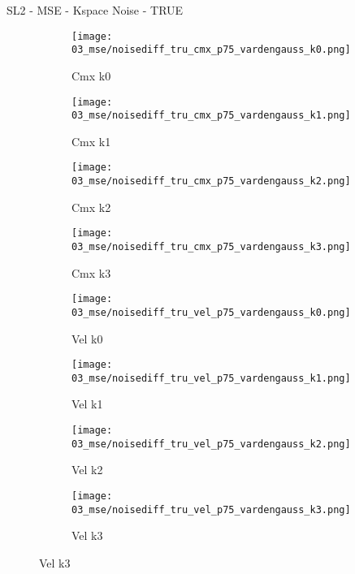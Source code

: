 \documentclass{beamer}
\begin{document}
\begin{frame}{SL2 - MSE - Kspace Noise - TRUE}{}
\begin{figure}
\begin{subfigure}{0.24\textwidth}
\texttt{[image: 03\_mse/noisediff\_tru\_cmx\_p75\_vardengauss\_k0.png]}
\vspace{-20pt}
\caption*{\tiny Cmx k0}
\end{subfigure}
\begin{subfigure}{0.24\textwidth}
\texttt{[image: 03\_mse/noisediff\_tru\_cmx\_p75\_vardengauss\_k1.png]}
\vspace{-20pt}
\caption*{\tiny Cmx k1}
\end{subfigure}
\begin{subfigure}{0.24\textwidth}
\texttt{[image: 03\_mse/noisediff\_tru\_cmx\_p75\_vardengauss\_k2.png]}
\vspace{-20pt}
\caption*{\tiny Cmx k2}
\end{subfigure}
\begin{subfigure}{0.24\textwidth}
\texttt{[image: 03\_mse/noisediff\_tru\_cmx\_p75\_vardengauss\_k3.png]}
\vspace{-20pt}
\caption*{\tiny Cmx k3}
\end{subfigure}

\begin{subfigure}{0.24\textwidth}
\texttt{[image: 03\_mse/noisediff\_tru\_vel\_p75\_vardengauss\_k0.png]}
\vspace{-20pt}
\caption*{\tiny Vel k0}
\end{subfigure}
\begin{subfigure}{0.24\textwidth}
\texttt{[image: 03\_mse/noisediff\_tru\_vel\_p75\_vardengauss\_k1.png]}
\vspace{-20pt}
\caption*{\tiny Vel k1}
\end{subfigure}
\begin{subfigure}{0.24\textwidth}
\texttt{[image: 03\_mse/noisediff\_tru\_vel\_p75\_vardengauss\_k2.png]}
\vspace{-20pt}
\caption*{\tiny Vel k2}
\end{subfigure}
\begin{subfigure}{0.24\textwidth}
\texttt{[image: 03\_mse/noisediff\_tru\_vel\_p75\_vardengauss\_k3.png]}
\vspace{-20pt}
\caption*{\tiny Vel k3}
\end{subfigure}
\end{figure}
\end{frame}
\end{document}
